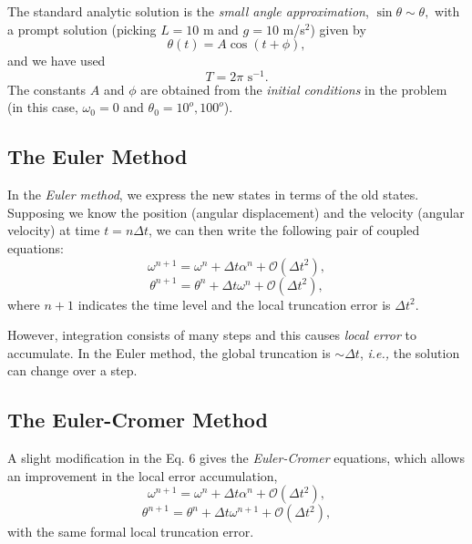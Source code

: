 \documentclass[12pt]{article}
\newcommand{\ie}{{\it i.e., }}
\begin{document}
The standard analytic solution is the {\it small angle approximation}, $\sin \theta \sim \theta,$
with a prompt solution (picking $L=10$ m and $g = 10$ m/s$^2$) given by
$$ \theta (t) =  A \cos (t + \phi),$$
and we have used
$$T = 2 \pi \mbox { s}^{-1}.$$
The constants $A$ and $\phi$ are obtained from the {\it initial conditions} in the problem (in this case, $\omega_0=0$ and $\theta_0=10^o,100^{o}$). 


\quad



\subsection*{The Euler Method}

In the {\it Euler method}, we express the new states in terms of the old states. Supposing we know the position (angular displacement) and the velocity (angular velocity) at time $t=n\Delta t$, we can then write the following pair of coupled equations:
\begin{equation}
 \omega^{n+1} = \omega^n + \Delta t \alpha^n + \mathcal{O}(\Delta t^2),
\end{equation}
\begin{equation}
 \theta^{n+1} = \theta^n + \Delta t \omega^n + \mathcal{O}(\Delta t^2),
\end{equation}
where $n+1$ indicates the time level and the local truncation error is $\Delta t^2$.

\quad

However, integration consists of many steps and this causes {\it local error} to accumulate. In the Euler method, the global truncation is $\sim \Delta t$, \ie the solution  can change over a step.

\quad

\subsection*{The Euler-Cromer Method}
A slight modification in the Eq. 6 gives the {\it Euler-Cromer} equations, which allows an improvement in the local error accumulation,
\begin{equation}
 \omega^{n+1} = \omega^n + \Delta t \alpha^n + \mathcal{O}(\Delta t^2),
\end{equation}
\begin{equation}
 \theta^{n+1} = \theta^n + \Delta t \omega^{n+1} + \mathcal{O}(\Delta t^2),
\end{equation}
with the same formal local truncation error.
\end{document}
